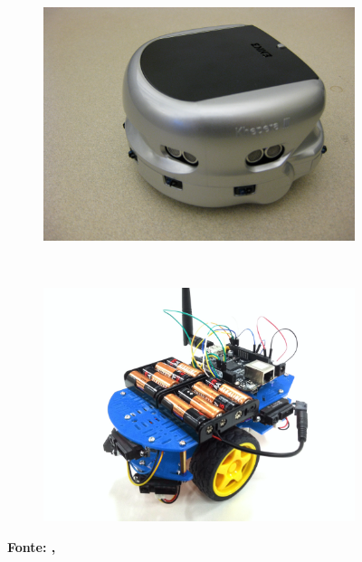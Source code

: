 \begin{figure}[h]
\centering
\caption{Robôs Khepera 3 e QuickBot}
\label{fig:RobosK3QB}
	\begin{subfigure}[b]{0.49\textwidth}%
		\centering
		\includegraphics[trim= 8cm 0cm 0cm 0cm,clip,
scale=0.14]{Figuras/Khepera_III_robot}
	  	\label{fig:test1}
	\end{subfigure}
	~
	\begin{subfigure}[b]{0.49\textwidth}%
		\centering
		\includegraphics[trim={6cm 0cm 3cm 0cm},clip,
scale=0.09]{Figuras/quickbot-blue}
	  	\label{fig:test2}
	\end{subfigure}
	
	\textbf{Fonte: , }
\end{figure}


